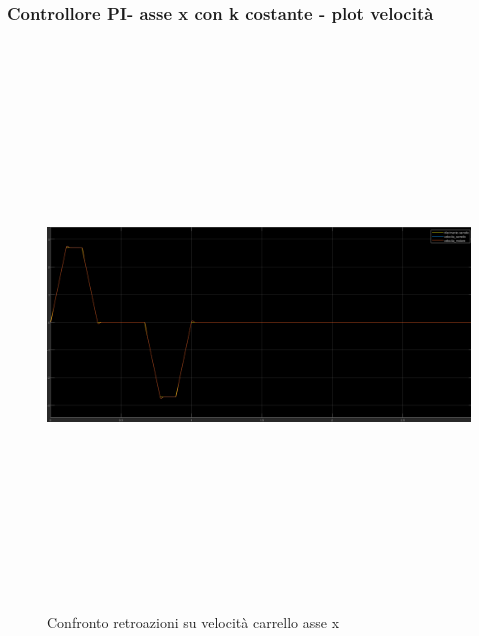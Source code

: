 \documentclass{article}
\begin{document}
\subsubsection{Controllore PI- asse x con k costante - plot velocità}

\begin{figure}[H]
\centering
\includegraphics[width=13cm,height=15cm,keepaspectratio]{./simulink/ldm_rigido/PIDX_VELOCITA}
\caption{Confronto retroazioni su velocità carrello asse x}
\end{figure}
\end{document}
